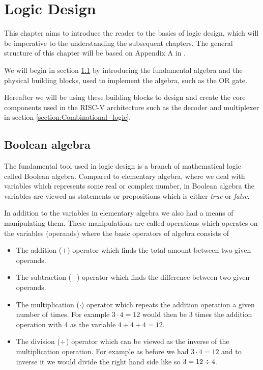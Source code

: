 \chapter{Logic Design}

This chapter aims to introduce the reader to the basics of logic design, which will be imperative to the understanding the subsequent chapters. The general structure of this chapter will be based on Appendix A in \cite{riscVbook}. 

We will begin in section \ref{section:Boolean_algebra} by introducing the fundamental algebra and the physical building blocks, used to implement the algebra, such as the OR gate. 

Hereafter we will be using these building blocks to design and create the core components used in the RISC-V architecture such as the decoder and multiplexer in section \ref{section:Combinational_logic}. 

\section{Boolean algebra}\label{section:Boolean_algebra}

    The fundamental tool used in logic design is a branch of mathematical logic called Boolean algebra. Compared to elementary algebra, where we deal with variables which represents some real or complex number, in Boolean algebra the variables are viewed as statements or propositions which is either \textit{true} or \textit{false}.
    
    In addition to the variables in elementary algebra we also had a means of manipulating them. These manipulations are called operations which operates on the variables (operands) where the basic operators of algebra consists of 
    
    \begin{itemize}
        \item The addition ($+$) operator which finds the total amount between two given operands.
        \item The subtraction ($-$) operator which finds the difference between two given operands.
        \item The multiplication ($\cdot$) operator which repeats the addition operation a given number of times.
              For example $3 \cdot 4 = 12$ would then be 3 times the addition operation with 4 as the variable $4+4+4 = 12$.
        \item The division ($ \divisionsymbol $) operator which can be viewed as the inverse of the multiplication operation. For example as before we had $3 \cdot 4 = 12$ and to inverse it we would divide the right hand side like so $3 = 12 \divisionsymbol 4$.    
    \end{itemize}
    

